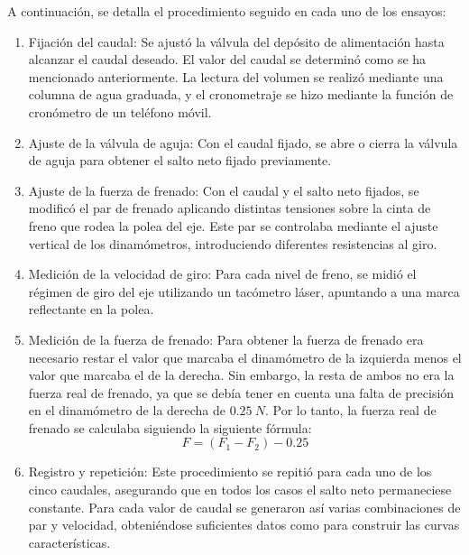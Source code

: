 \documentclass[10pt]{IEEEtran}
\begin{document}
A continuación, se detalla el procedimiento seguido en cada uno de los ensayos:
\begin{enumerate}
  \item Fijación del caudal: Se ajustó la válvula del depósito de alimentación hasta alcanzar el caudal deseado. El valor del caudal se determinó como se ha mencionado anteriormente. La lectura del volumen se realizó mediante una columna de agua graduada, y el cronometraje se hizo mediante la función de cronómetro de un teléfono móvil.
  \item Ajuste de la válvula de aguja: Con el caudal fijado, se abre o cierra la válvula de aguja para obtener el salto neto fijado previamente.
  \item Ajuste de la fuerza de frenado: Con el caudal y el salto neto fijados, se modificó el par de frenado aplicando distintas tensiones sobre la cinta de freno que rodea la polea del eje. Este par se controlaba mediante el ajuste vertical de los dinamómetros, introduciendo diferentes resistencias al giro.
  \item Medición de la velocidad de giro: Para cada nivel de freno, se midió el régimen de giro del eje utilizando un tacómetro láser, apuntando a una marca reflectante en la polea.
  \item Medición de la fuerza de frenado: Para obtener la fuerza de frenado era necesario restar el valor que marcaba el dinamómetro de la izquierda menos el valor que marcaba el de la derecha. Sin embargo, la resta de ambos no era la fuerza real de frenado, ya que se debía tener en cuenta una falta de precisión en el dinamómetro de la derecha de $0.25\ N$. Por lo tanto, la fuerza real de frenado se calculaba siguiendo la siguiente fórmula:
  \begin{equation}
    F = (F_1 - F_2) - 0.25
  \end{equation}
  \item Registro y repetición: Este procedimiento se repitió para cada uno de los cinco caudales, asegurando que en todos los casos el salto neto permaneciese constante. Para cada valor de caudal se generaron así varias combinaciones de par y velocidad, obteniéndose suficientes datos como para construir las curvas características.
\end{enumerate}
\end{document}
